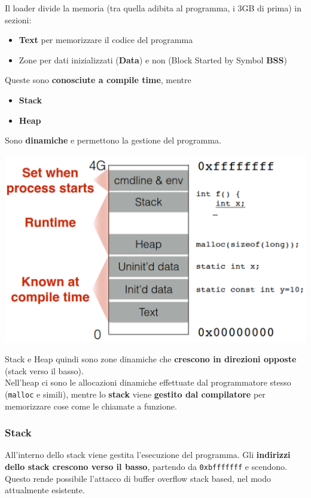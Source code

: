 Il loader divide la memoria (tra quella adibita al programma, i 3GB di prima) in sezioni:
\begin{itemize}
	\item \textbf{Text} per memorizzare il codice del programma
	\item Zone per dati inizializzati (\textbf{Data}) e non (Block Started by Symbol \textbf{BSS})
\end{itemize}
Queste sono \textbf{conosciute a compile time}, mentre
\begin{itemize}
	\item \textbf{Stack}
	\item \textbf{Heap}
\end{itemize}
Sono \textbf{dinamiche} e permettono la gestione del programma.
\begin{center}
	\includegraphics[width=0.85\linewidth]{img/sme/memory_all1}
\end{center}

Stack e Heap quindi sono zone dinamiche che \textbf{crescono in direzioni opposte} (stack verso il basso).\\
Nell'heap ci sono le allocazioni dinamiche effettuate dal programmatore stesso (\texttt{malloc} e simili), mentre lo \textbf{stack} viene \textbf{gestito dal compilatore} per memorizzare cose come le chiamate a funzione. \\

\newpage

\subsubsection{Stack}
All'interno dello stack viene gestita l'esecuzione del programma. Gli \textbf{indirizzi dello stack crescono verso il basso}, partendo da \texttt{0xbfffffff} e scendono. Questo rende possibile l'attacco di buffer overflow stack based, nel modo attualmente esistente.\\

